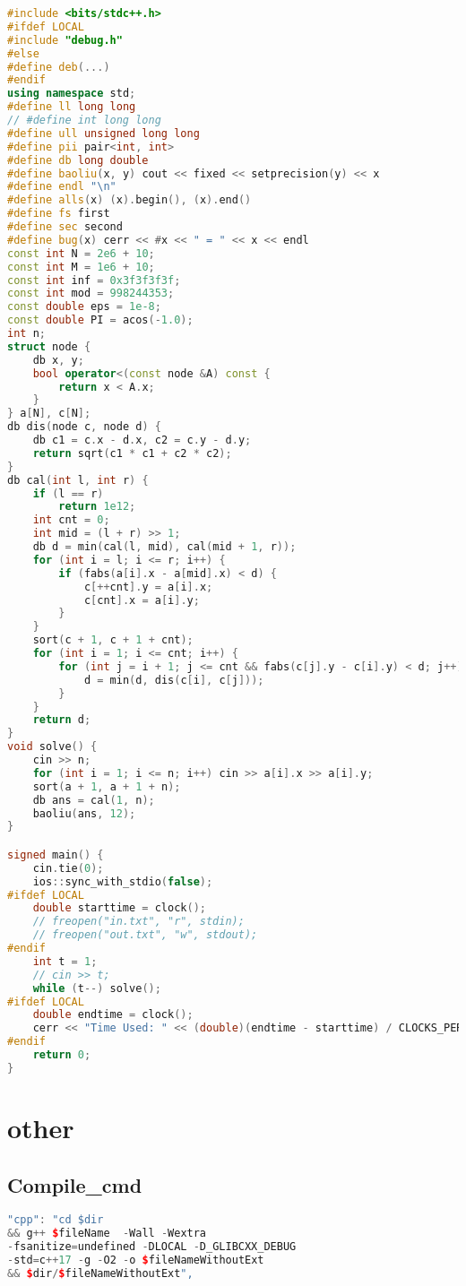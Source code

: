 \begin{lstlisting}[language=C++]
#include <bits/stdc++.h>
#ifdef LOCAL
#include "debug.h"
#else
#define deb(...)
#endif
using namespace std;
#define ll long long
// #define int long long
#define ull unsigned long long
#define pii pair<int, int>
#define db long double
#define baoliu(x, y) cout << fixed << setprecision(y) << x
#define endl "\n"
#define alls(x) (x).begin(), (x).end()
#define fs first
#define sec second
#define bug(x) cerr << #x << " = " << x << endl
const int N = 2e6 + 10;
const int M = 1e6 + 10;
const int inf = 0x3f3f3f3f;
const int mod = 998244353;
const double eps = 1e-8;
const double PI = acos(-1.0);
int n;
struct node {
    db x, y;
    bool operator<(const node &A) const {
        return x < A.x;
    }
} a[N], c[N];
db dis(node c, node d) {
    db c1 = c.x - d.x, c2 = c.y - d.y;
    return sqrt(c1 * c1 + c2 * c2);
}
db cal(int l, int r) {
    if (l == r)
        return 1e12;
    int cnt = 0;
    int mid = (l + r) >> 1;
    db d = min(cal(l, mid), cal(mid + 1, r));
    for (int i = l; i <= r; i++) {
        if (fabs(a[i].x - a[mid].x) < d) {
            c[++cnt].y = a[i].x;
            c[cnt].x = a[i].y;
        }
    }
    sort(c + 1, c + 1 + cnt);
    for (int i = 1; i <= cnt; i++) {
        for (int j = i + 1; j <= cnt && fabs(c[j].y - c[i].y) < d; j++) {
            d = min(d, dis(c[i], c[j]));
        }
    }
    return d;
}
void solve() {
    cin >> n;
    for (int i = 1; i <= n; i++) cin >> a[i].x >> a[i].y;
    sort(a + 1, a + 1 + n);
    db ans = cal(1, n);
    baoliu(ans, 12);
}

signed main() {
    cin.tie(0);
    ios::sync_with_stdio(false);
#ifdef LOCAL
    double starttime = clock();
    // freopen("in.txt", "r", stdin);
    // freopen("out.txt", "w", stdout);
#endif
    int t = 1;
    // cin >> t;
    while (t--) solve();
#ifdef LOCAL
    double endtime = clock();
    cerr << "Time Used: " << (double)(endtime - starttime) / CLOCKS_PER_SEC * 1000 << " ms" << endl;
#endif
    return 0;
}
\end{lstlisting}
\section{other}
\subsection{Compile\_cmd}
\begin{lstlisting}[language=C++]
"cpp": "cd $dir 
&& g++ $fileName  -Wall -Wextra 
-fsanitize=undefined -DLOCAL -D_GLIBCXX_DEBUG 
-std=c++17 -g -O2 -o $fileNameWithoutExt 
&& $dir/$fileNameWithoutExt",
\end{lstlisting}
